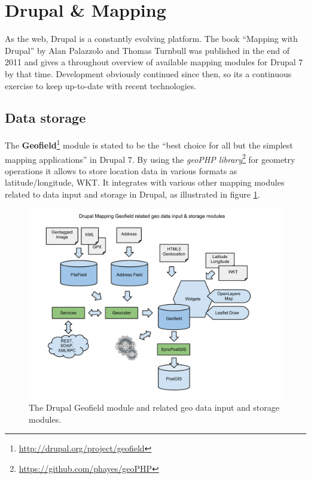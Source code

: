 
%
%

\section{Drupal \& Mapping}

As the web, Drupal is a constantly evolving platform. The book ``Mapping with Drupal''\cite{Zzolo11mappingdrupal} by Alan Palazzolo and Thomas Turnbull was published in the end of 2011 and gives a throughout overview of available mapping modules for Drupal 7 by that time. Development obviously continued since then, so its a continuous exercise to keep up-to-date with recent technologies.

\subsection{Data storage}

The \textbf{Geofield}\footnote{\url{http://drupal.org/project/geofield}} module is stated to be the ``best choice for all but the simplest mapping applications''\cite[page 27]{Zzolo11mappingdrupal} in Drupal 7. By using the \textit{geoPHP library}\footnote{\url{https://github.com/phayes/geoPHP}} for geometry operations it allows to store location data in various formats as latitude/longitude, WKT. It integrates with various other mapping modules related to data input and storage in Drupal, as illustrated in figure \ref{fig:geofield}.

\begin{figure}[h]
  \begin{center}
    \includegraphics[width=1.2\textwidth]{figures/drupal_mapping_geofield.pdf}
    \caption{The Drupal Geofield module and related geo data input and storage modules.}
    \label{fig:geofield}
  \end{center}
\end{figure}

